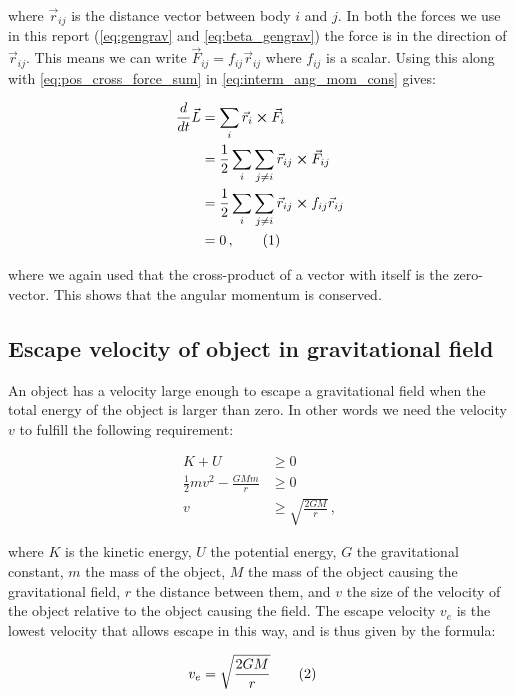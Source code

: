 \documentclass[reprint,english,notitlepage]{revtex4-1}  %
\newcommand\numberthis{\addtocounter{equation}{1}\tag{\theequation}}
\begin{document}
where $\vec{r}_{ij}$ is the distance vector between body $i$ and $j$. In both the forces we use in this report (\eqref{eq:gengrav} and \eqref{eq:beta_gengrav}) the force is in the direction of $\vec{r}_{ij}$. This means we can write $\vec{F}_{ij} = f_{ij} \vec{r}_{ij}$ where $f_{ij}$ is a scalar. Using this along with \eqref{eq:pos_cross_force_sum} in \eqref{eq:interm_ang_mom_cons} gives:

\begin{align*}
\frac{d}{dt} \vec{L} &= \sum\limits_i \vec{r}_i \cross \vec{F}_i \\
&= \frac{1}{2} \sum\limits_i \sum\limits_{j\neq i } \vec{r}_{ij} \cross \vec{F}_{ij} \\
&= \frac{1}{2} \sum\limits_i \sum\limits_{j\neq i } \vec{r}_{ij} \cross f_{ij} \vec{r}_{ij} \\
&= 0 \, , \numberthis \label{eq:ang_mom_cons}
\end{align*}

where we again used that the cross-product of a vector with itself is the zero-vector. This shows that the angular momentum is conserved.

\subsection{Escape velocity of object in gravitational field} \label{sec:II:e}

An object has a velocity large enough to escape a gravitational field when the total energy of the object is larger than zero. In other words we need the velocity $v$ to fulfill the following requirement:

\begin{align*}
K + U &\geq 0 \\
\frac{1}{2}mv^2 - \frac{GMm}{r} &\geq 0 \\
v &\geq \sqrt{\frac{2GM}{r}} \, ,
\end{align*}

where $K$ is the kinetic energy, $U$ the potential energy, $G$ the gravitational constant, $m$ the mass of the object, $M$ the mass of the object causing the gravitational field, $r$ the distance between them, and $v$ the size of the velocity of the object relative to the object causing the field. The escape velocity $v_e$ is the lowest velocity that allows escape in this way, and is thus given by the formula:

\begin{align*}
v_e &= \sqrt{\frac{2GM}{r}} \numberthis \label{eq:esc_vel}
\end{align*}
\end{document}
